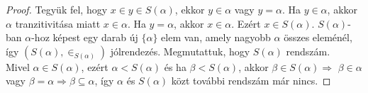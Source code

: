 \begin{proof} Tegyük fel, hogy $x \in y \in S(\alpha)$, ekkor $y \in \alpha$ vagy $y = \alpha$. Ha $y \in \alpha$, akkor $\alpha$ tranzitivitása miatt $x \in \alpha$. Ha $y = \alpha$, akkor $x \in \alpha$. Ezért $x \in S(\alpha)$. $S(\alpha)$-ban $\alpha$-hoz képest egy darab új $\lbrace \alpha \rbrace$ elem van, amely nagyobb $\alpha$ összes eleménél, így $(S(\alpha), \in_{S(\alpha)} )$ jólrendezés. Megmutattuk, hogy $S(\alpha)$ rendszám. \\
\indent Mivel $\alpha \in S(\alpha)$, ezért $\alpha < S(\alpha)$ és ha $\beta < S(\alpha)$, akkor $\beta \in S(\alpha) \Rightarrow$ $\beta \in \alpha$ vagy $\beta = \alpha \Rightarrow \beta \subseteq \alpha$, így $\alpha$ és $S(\alpha)$ közt további rendszám már nincs.
\end{proof}
